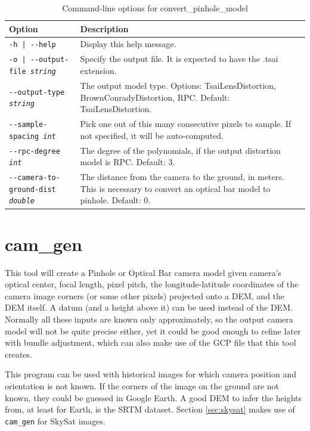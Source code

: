 \begin{longtable}{|l|p{7.5cm}|}
\caption{Command-line options for convert\_pinhole\_model}
\label{tbl:convertpinholemodel}
\endfirsthead
\endhead
\endfoot
\endlastfoot
\hline
Option & Description \\ \hline \hline
\texttt{-h | -\/-help } & Display this help message.\\ \hline

\texttt{-o | -\/-output-file \textit{string} } & Specify the output file. It is expected to have the .tsai extension. \\ \hline

\texttt{-\/-output-type \textit{string}} & The output model type. Options: TsaiLensDistortion, 
BrownConradyDistortion, RPC. Default: TsaiLensDistortion.\\ \hline

\texttt{-\/-sample-spacing \textit{int}} & Pick one out of this many consecutive pixels to sample. If not specified, it will be auto-computed. \\ \hline

\texttt{-\/-rpc-degree \textit{int}} & The degree of the polynomials, if the output distortion model is RPC. Default: 3. \\ \hline

\texttt{-\/-camera-to-ground-dist \textit{double}} & The distance from the camera to the ground, in meters. This is necessary to convert an optical bar model to pinhole. Default: 0. \\ \hline

\end{longtable}

\clearpage

\section{cam\_gen}
\label{camgen}

This tool will create a Pinhole or Optical Bar camera model given camera's optical
center, focal length, pixel pitch, the longitude-latitude coordinates of
the camera image corners (or some other pixels) projected onto a DEM,
and the DEM itself. A datum (and a height above it) can be used instead
of the DEM. Normally all these inputs are known only approximately, so
the output camera model will not be quite precise either, yet it could
be good enough to refine later with bundle adjustment, which can also
make use of the GCP file that this tool creates.

This program can be used with historical images for which camera position and orientation
is not known. If the corners of the image on the ground are not known, they could be guessed
in Google Earth. A good DEM to infer the heights from, at least for Earth,
is the SRTM dataset. Section \ref{sec:skysat} makes use of \texttt{cam\_gen} for SkySat images.

